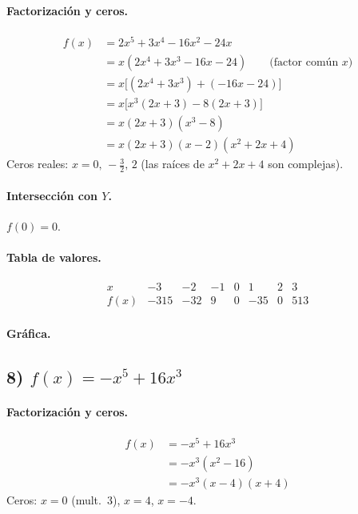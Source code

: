 \documentclass[12pt,a4paper]{article}
\begin{document}
	\paragraph{Factorización y ceros.}
	\begin{align*}
		f(x) &= 2x^{5}+3x^{4}-16x^{2}-24x\\
		&= x(2x^{4}+3x^{3}-16x-24) \qquad \text{(factor común \(x\))}\\
		&= x\bigl[(2x^{4}+3x^{3})+(-16x-24)\bigr]\\
		&= x\bigl[x^{3}(2x+3)-8(2x+3)\bigr]\\
		&= x(2x+3)(x^{3}-8)\\
		&= x(2x+3)(x-2)(x^{2}+2x+4)
	\end{align*}
	Ceros reales: \(x=0,\,-\tfrac{3}{2},\,2\) (las raíces de \(x^{2}+2x+4\) son complejas).
	
	\paragraph{Intersección con \(Y\).} \(f(0)=0\).
	
	\paragraph{Tabla de valores.}
	\[
	\begin{array}{c|rrrrrrr}
		x & -3 & -2 & -1 & 0 & 1 & 2 & 3\\\hline
		f(x) & -315 & -32 & 9 & 0 & -35 & 0 & 513
	\end{array}
	\]
	
	\paragraph{Gráfica.}
	
	\bigskip
	
	\subsection*{8) \(f(x)=-x^{5}+16x^{3}\)}
	\paragraph{Factorización y ceros.}
	\begin{align*}
		f(x) &= -x^{5}+16x^{3}\\
		&= -x^{3}(x^{2}-16)\\
		&= -x^{3}(x-4)(x+4)
	\end{align*}
	Ceros: \(x=0\) (mult.\ 3), \(x=4\), \(x=-4\).
	
\end{document}

